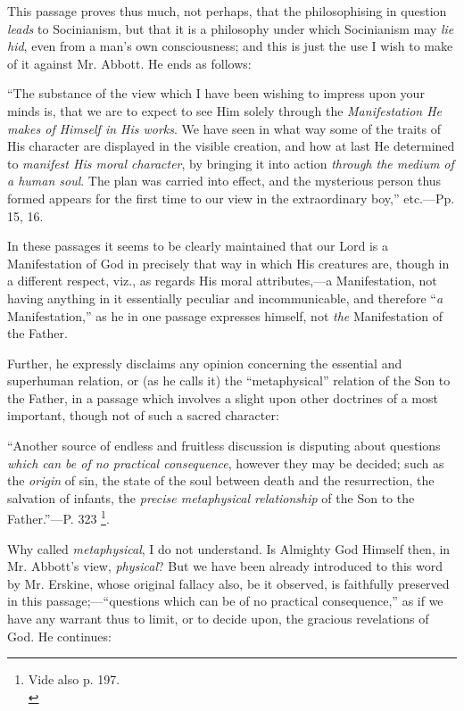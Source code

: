This passage proves thus much, not perhaps, that
the philosophising in question \emph{leads} to Socinianism, but that it is a
philosophy under which Socinianism may \emph{lie hid}, even from a man's
own consciousness; and this is just the use I wish to make of it
against Mr. Abbott. He ends as follows:

``The substance
of the view which I have been wishing to impress upon your minds is,
that we are to expect to see Him solely through the \emph{Manifestation
He makes of Himself in His works}. We have seen in what way some of
the traits of His character are displayed in the visible creation, and
how at last He determined to \emph{manifest His moral character}, by
bringing it into action \emph{through the medium of a human soul}. The
plan was carried into effect, and the mysterious person thus formed
appears for the first time to our view in the extraordinary boy,''
etc.—Pp. 15, 16.

In these passages it seems to be clearly
maintained that our Lord is a Manifestation of God in precisely that
way in which His creatures are, though in a different respect, viz.,
as regards His moral attributes,—a Manifestation, not having
anything in it essentially peculiar and incommunicable, and therefore ``\emph{a} Manifestation,'' as he in one passage expresses
himself, not \emph{the} Manifestation of the Father.

Further, he expressly disclaims any opinion
concerning the essential and superhuman relation, or (as he calls it)
the ``metaphysical'' relation of the Son to the Father, in a passage
which involves a slight upon other doctrines of a most important,
though not of such a sacred character:

``Another source
of endless and fruitless discussion is disputing about questions \emph{which
can be of no practical consequence}, however they may be decided;
such as the \emph{origin} of sin, the state of the soul between death
and the resurrection, the salvation of infants, the \emph{precise
metaphysical relationship} of the Son to the Father.''—P. 323
\footnote{Vide also p. 197.\textbf{}\\}.

Why called \emph{metaphysical}, I do not
understand. Is Almighty God Himself then, in Mr. Abbott's view, \emph{physical}?
But we have been already introduced to this word by Mr. Erskine, whose
original fallacy also, be it observed, is faithfully preserved in this
passage;—``questions which can be of no practical consequence,''
as if we have any warrant thus to limit, or to decide upon, the
gracious revelations of God. He continues:

